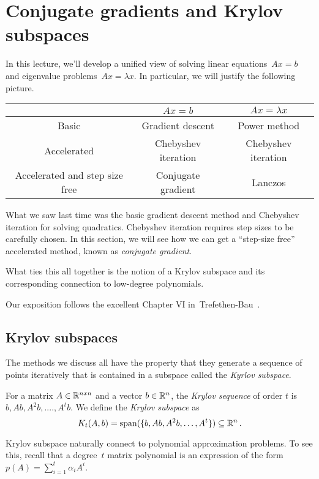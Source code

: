 \section{Conjugate gradients and Krylov subspaces}

In this lecture, we'll develop a unified view of solving linear equations~$Ax=b$
and eigenvalue problems~$Ax=\lambda x.$ In particular, we will justify the
following picture.
%
\begin{center}
\begin{tabular}{ | c |c| c | } 
\hline
 & $Ax=b$ & $Ax=\lambda x$ \\ 
\hline
Basic & Gradient descent & Power method \\ 
\hline
Accelerated & Chebyshev iteration & Chebyshev iteration \\
\hline
Accelerated and step size free & Conjugate gradient & Lanczos \\
\hline
\end{tabular}
\end{center}

What we saw last time was the basic gradient descent method and Chebyshev
iteration for solving quadratics. Chebyshev iteration requires step sizes to be
carefully chosen. In this section, we will see how we can get a ``step-size
free'' accelerated method, known as \emph{conjugate gradient}.

What ties this all together is the notion of a Krylov subspace and its
corresponding connection to low-degree polynomials.

Our exposition follows the excellent Chapter VI
in~Trefethen-Bau~\cite{trefethen97}.

\subsection{Krylov subspaces}
%
The methods we discuss all have the property that they generate a sequence of
points iteratively that is contained in a subspace called the \emph{Kyrlov
subspace}.
%
\begin{definition}
For a matrix $A \in \mathbb{R}^{n x n}$ and a vector $b \in \mathbb{R}^n$, 
the \emph{Krylov sequence} of order $t$ is $b, Ab, A^2b, ...., A^tb$. 
We define the \emph{Krylov subspace} as
\[
K_t(A,b)=\mathrm{span}(\{b, Ab, A^2b, \ldots, A^t\}) \subseteq \mathbb{R}^n\,.
\]
\end{definition}

Krylov subspace naturally connect to polynomial approximation problems.
To see this, recall that a degree~$t$ matrix polynomial is an expression of the form
$p(A)=\sum_{i=1}^t \alpha_i A^i.$ 

